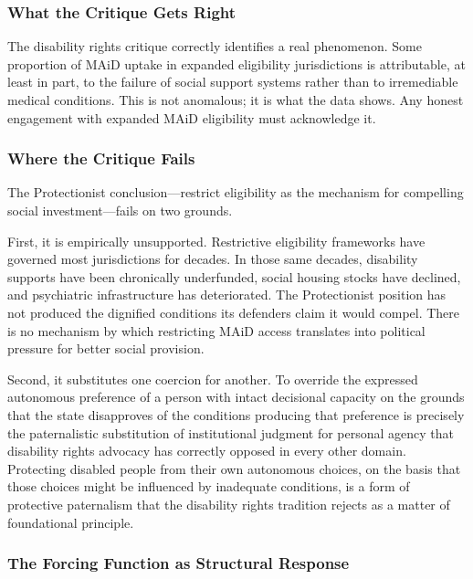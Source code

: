 \documentclass[11pt, letterpaper]{article}
\begin{document}
\subsubsection{What the Critique Gets Right}

The disability rights critique correctly identifies a real phenomenon. Some proportion
of MAiD uptake in expanded eligibility jurisdictions is attributable, at least in part,
to the failure of social support systems rather than to irremediable medical conditions.
This is not anomalous; it is what the data shows. Any honest engagement with expanded
MAiD eligibility must acknowledge it.

\subsubsection{Where the Critique Fails}

The Protectionist conclusion---restrict eligibility as the mechanism for compelling
social investment---fails on two grounds.

First, it is empirically unsupported. Restrictive eligibility frameworks have governed
most jurisdictions for decades. In those same decades, disability supports have been
chronically underfunded, social housing stocks have declined, and psychiatric
infrastructure has deteriorated. The Protectionist position has not produced the
dignified conditions its defenders claim it would compel. There is no mechanism by
which restricting MAiD access translates into political pressure for better social
provision.

Second, it substitutes one coercion for another. To override the expressed autonomous
preference of a person with intact decisional capacity on the grounds that the state
disapproves of the conditions producing that preference is precisely the paternalistic
substitution of institutional judgment for personal agency that disability rights
advocacy has correctly opposed in every other domain. Protecting disabled people from
their own autonomous choices, on the basis that those choices might be influenced by
inadequate conditions, is a form of protective paternalism that the disability rights
tradition rejects as a matter of foundational principle.

\subsubsection{The Forcing Function as Structural Response}
\end{document}
